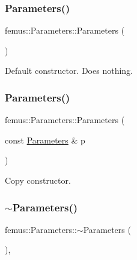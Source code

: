 \subsubsection{\texorpdfstring{Parameters()}{Parameters()}\hspace{0.1cm}{\footnotesize\ttfamily [1/2]}}
{\footnotesize\ttfamily femus\+::\+Parameters\+::\+Parameters (\begin{DoxyParamCaption}{ }\end{DoxyParamCaption})\hspace{0.3cm}{\ttfamily [inline]}}

Default constructor. Does nothing. \mbox{\label{classfemus_1_1_parameters_ab0264eab475b57d22ac01ae4e180be7d}} 
\subsubsection{\texorpdfstring{Parameters()}{Parameters()}\hspace{0.1cm}{\footnotesize\ttfamily [2/2]}}
{\footnotesize\ttfamily femus\+::\+Parameters\+::\+Parameters (\begin{DoxyParamCaption}\item[{const \mbox{\hyperlink{classfemus_1_1_parameters}{Parameters}} \&}]{p }\end{DoxyParamCaption})\hspace{0.3cm}{\ttfamily [inline]}}

Copy constructor. \mbox{\label{classfemus_1_1_parameters_ac4d54f25cdc1ba7c7deda53a002c787b}} 
\subsubsection{\texorpdfstring{$\sim$\+Parameters()}{~Parameters()}}
{\footnotesize\ttfamily femus\+::\+Parameters\+::$\sim$\+Parameters (\begin{DoxyParamCaption}{ }\end{DoxyParamCaption})\hspace{0.3cm}{\ttfamily [inline]}, {\ttfamily [virtual]}}

